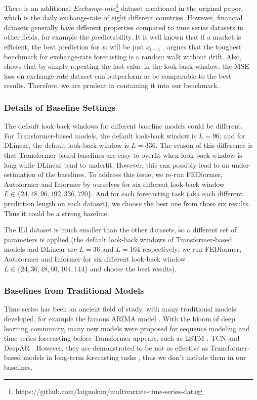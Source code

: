 \documentclass{article} %
\begin{document}
There is an additional \textit{Exchange-rate}\footnote{https://github.com/laiguokun/multivariate-time-series-data} dataset mentioned in the original paper, which is the daily exchange-rate of eight different countries. However, financial datasets generally have different properties compared to time series datasets in other fields, for example the predictability. It is well known that if a market is efficient, the best prediction for $x_t$ will be just $x_{t-1}$ \citep{emh}. \citet{exchange} argues that the toughest benchmark for exchange-rate forecasting is a random walk without drift. Also, \citet{dlinear} shows that by simply repeating the last value in the look-back window, the MSE loss on exchange-rate dataset can outperform or be comparable to the best results. Therefore, we are prudent in containing it into our benchmark.

\subsubsection{Details of Baseline Settings}
\label{append::baseline}

The default look-back windows for different baseline models could be different. For Transformer-based models, the default look-back window is $L=96$; and for DLinear, the default look-back window is $L=336$. The reason of this difference is that Transformer-based baselines are easy to overfit when look-back window is long while DLinear tend to underfit. However, this can possibly lead to an under-estimation of the baselines. To address this issue, we re-run FEDformer, Autoformer and Informer by ourselves for six different look-back window $L\in \{24, 48, 96, 192, 336, 720\}$. And for each forecasting task (aka each different prediction length on each dataset), we choose the best one from those six results. Thus it could be a strong baseline.

The ILI dataset is much smaller than the other datasets, so a different set of parameters is applied (the default look-back windows of Transformer-based models and DLinear are $L=36$ and $L=104$ respectively; we run FEDformer, Autoformer and Informer for six different look-back window $L\in \{24, 36, 48, 60, 104, 144\}$ and choose the best results). 

\subsubsection{Baselines from Traditional Models}

Time series has been an ancient field of study, with many traditional models developed, for example the famous ARIMA model \citep{arima}. With the bloom of deep learning community, many new models were proposed for sequence modeling and time series forecasting before Transformer appears, such as LSTM \citep{lstm}, TCN \citep{tcn} and DeepAR \citep{deepar}. However, they are demonstrated to be not as effective as Transformer-based models in long-term forecasting tasks \citep{informer,autoformer}, thus we don't include them in our baselines.
\end{document}
